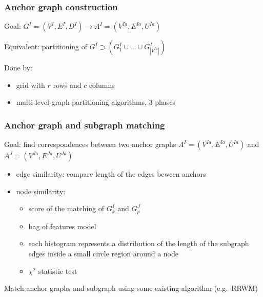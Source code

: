 \documentclass[handout]{beamer}
\begin{document}
\begin{frame}
\frametitle{Anchor graph construction}
Goal: $G^I=(V^I,E^I, D^I)\rightarrow A^I=(V^{Ia},E^{Ia},U^{Ia})$

Equivalent: partitioning of $G^I\supset(G^I_1\cup\dots\cup G^I_{|V^{Ia}|})$

Done by: \begin{itemize}
			\item grid with $r$ rows and $c$ columns
			\item multi-level graph partitioning algorithms, 3 phases
		\end{itemize}
\end{frame}
\begin{frame}
\frametitle{Anchor graph and subgraph matching}
Goal: find correspondences between two anchor graphs $A^I=(V^{Ia},E^{Ia},U^{Ia})$ and $A^J=(V^{Ja},E^{Ja},U^{Ja})$

\begin{itemize}
	\item edge similarity: compare length of the edges beween anchors
	\item node similarity: 
	\begin{itemize}
		\item score of the matching of $G^I_k$ and $G^J_p$
		\item bag of features model
		\item each histogram represents a distribution of
		the length of the subgraph edges inside a small circle region around a node
		\item $\chi^2$ statistic test
	\end{itemize}
\end{itemize}

Match anchor graphs and subgraph using some existing algorithm (e.g.~RRWM)
\end{frame}
\end{document}
